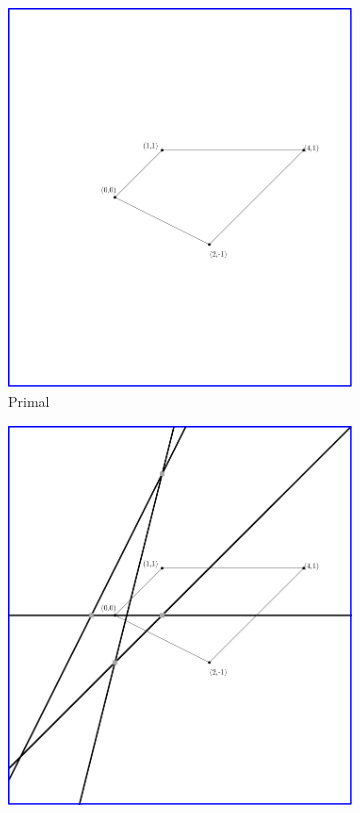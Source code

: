 \documentclass[11pt]{article}
\begin{document}
\begin{figure}[h!]
  \centering
  \begin{subfigure}{0.45\textwidth}
    \centering
    \includegraphics[width=\textwidth]{p1_base.png}
    \caption{Primal}
    \label{fig:y equals x}
\end{subfigure}
\hfill
\begin{subfigure}{0.45\textwidth}
    \centering
    \includegraphics[width=\textwidth]{p1_points.png}

\end{subfigure}
\end{figure}
\end{document}
